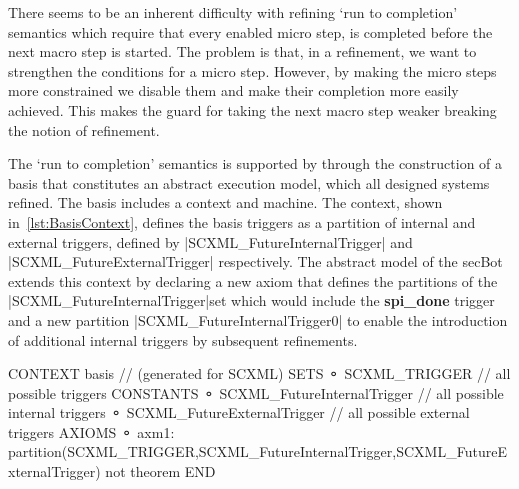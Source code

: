 There seems to be an inherent difficulty with refining `run to completion' semantics which require that every enabled micro step, is completed before the next macro step is started. The problem is that, in a refinement, we want to strengthen the conditions for a micro step. However, by making the micro steps more constrained we disable them and make their completion more easily achieved. This makes the guard for taking the next macro step weaker breaking the notion of refinement.




The `run to completion' semantics is supported by \EventB through the construction of a basis that constitutes an 
abstract execution model, which all designed systems refined. The basis includes a \EventB context and machine. 
The context, shown in~\ref{lst:BasisContext}, defines the basis triggers as a partition of internal and external triggers, defined by |SCXML_FutureInternalTrigger| and |SCXML_FutureExternalTrigger| respectively. The abstract model of the secBot extends this context by declaring a new axiom that defines the partitions of the |SCXML_FutureInternalTrigger|set which would include the \textbf{spi\_done} trigger and a new partition |SCXML_FutureInternalTrigger0| to enable the introduction of additional internal triggers by subsequent refinements. 

\begin{EventBcode} 
	CONTEXT
		basis 	// (generated for SCXML)
	SETS
	⚬	SCXML_TRIGGER	 // all possible triggers
	CONSTANTS
	⚬	SCXML_FutureInternalTrigger	 // all possible internal triggers
	⚬	SCXML_FutureExternalTrigger	 // all possible external triggers
	AXIOMS
	⚬	axm1:	partition(SCXML_TRIGGER,SCXML_FutureInternalTrigger,SCXML_FutureExternalTrigger) not theorem 
	END
\end{EventBcode}

